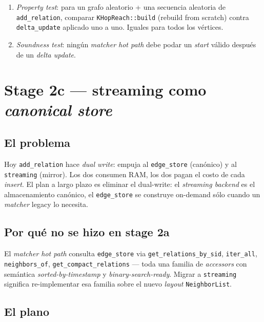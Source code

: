 \begin{enumerate}
    \item \emph{Property test}: para un grafo aleatorio + una
    secuencia aleatoria de \texttt{add\_relation}, comparar
    \texttt{KHopReach::build} (rebuild from scratch) contra
    \texttt{delta\_update} aplicado uno a uno. Iguales para todos los
    vértices.
    \item \emph{Soundness test}: ningún \emph{matcher hot path} debe
    podar un \emph{start} válido después de un \emph{delta update}.
\end{enumerate}

\section{Stage 2c — streaming como \emph{canonical store}}

\subsection{El problema}

Hoy \texttt{add\_relation} hace \emph{dual write}: empuja al
\texttt{edge\_store} (canónico) y al \texttt{streaming} (mirror).
Los dos consumen RAM, los dos pagan el costo de cada \emph{insert}.
El plan a largo plazo es eliminar el dual-write: el \emph{streaming
backend} es el almacenamiento canónico, el \texttt{edge\_store} se
construye on-demand sólo cuando un \emph{matcher} legacy lo necesita.

\subsection{Por qué no se hizo en stage 2a}

El \emph{matcher hot path} consulta \texttt{edge\_store} via
\texttt{get\_relations\_by\_sid}, \texttt{iter\_all},
\texttt{neighbors\_of}, \texttt{get\_compact\_relations} --- toda una
familia de \emph{accessors} con semántica \emph{sorted-by-timestamp}
y \emph{binary-search-ready}. Migrar a \texttt{streaming} significa
re-implementar esa familia sobre el nuevo \emph{layout}
\texttt{NeighborList}.

\subsection{El plano}

